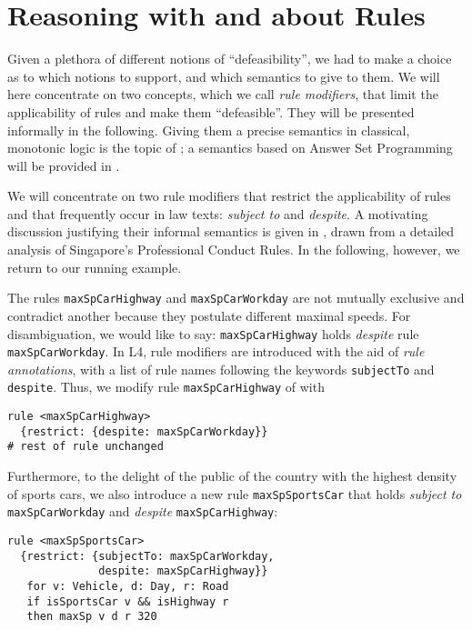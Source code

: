 \section{Reasoning with and about Rules}\label{sec:resasoning_with_rules}


Given a plethora of different notions of ``defeasibility'', we had to make a
choice as to which notions to support, and which semantics to give to them. We
will here concentrate on two concepts, which we call \emph{rule modifiers},
that limit the applicability of rules and make them ``defeasible''. They will
be presented informally in the following. Giving them a precise semantics in
classical, monotonic logic is the topic of ;
a semantics based on Answer Set Programming will be provided in
.

We will concentrate on two rule modifiers that restrict the applicability of
rules and that frequently occur in law texts: \emph{subject to} and
\emph{despite}. A motivating discussion justifying their informal semantics is
given in , drawn from a detailed
analysis of Singapore's Professional Conduct Rules. In the following, however,
we return to our running example.

\begin{example}
  The rules \texttt{maxSpCarHighway} and \texttt{maxSpCarWorkday} are not
  mutually exclusive and contradict another because they postulate different
  maximal speeds. For disambiguation, we would like to say:
  \texttt{maxSpCarHighway} holds \emph{despite} rule
  \texttt{maxSpCarWorkday}. In L4, rule modifiers are introduced with the aid
  of \emph{rule annotations}, with a list of rule names following the keywords
  \texttt{subjectTo} and \texttt{despite}. Thus, we modify rule
  \texttt{maxSpCarHighway} of  with
\begin{lstlisting}
rule <maxSpCarHighway>
  {restrict: {despite: maxSpCarWorkday}}
# rest of rule unchanged
\end{lstlisting}
Furthermore, to the delight of the public of the country with the highest
density of sports cars, we also introduce a new rule \texttt{maxSpSportsCar}
that holds \emph{subject to} \texttt{maxSpCarWorkday} and \emph{despite}
\texttt{maxSpCarHighway}:
\begin{lstlisting}
rule <maxSpSportsCar>
  {restrict: {subjectTo: maxSpCarWorkday, 
              despite: maxSpCarHighway}}
   for v: Vehicle, d: Day, r: Road
   if isSportsCar v && isHighway r
   then maxSp v d r 320
 \end{lstlisting}
\end{example}

